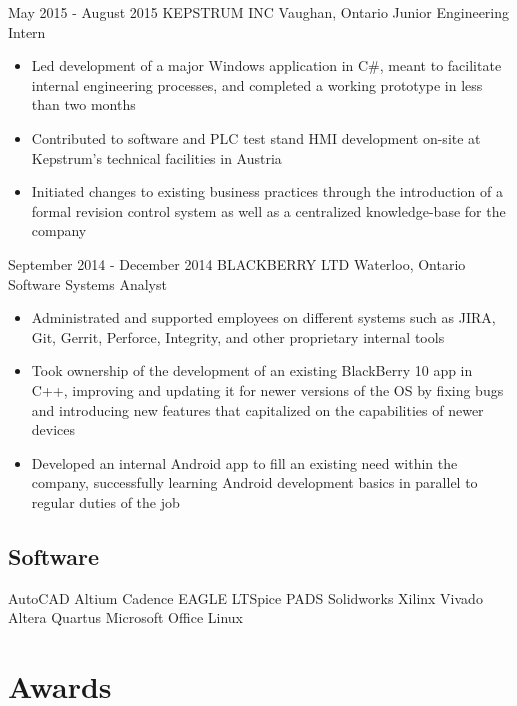 \documentclass[hidelinks]{kkurucz-cv}
\begin{document}
\begin{minipage}{\textwidth}
\begin{entrylist}
\entry
{May 2015 - August 2015}
{KEPSTRUM INC}
{Vaughan, Ontario}
{Junior Engineering Intern}
{
\begin{itemize}
	\item Led development of a major Windows application in C\#, meant to facilitate internal engineering processes, and completed a working prototype in less than two months
	\item Contributed to software and PLC test stand HMI development on-site at Kepstrum’s technical facilities in Austria
	\item Initiated changes to existing business practices through the introduction of a formal revision control system as well as a centralized knowledge-base for the company
\end{itemize}
}

\entry
{September 2014 - December 2014}
{BLACKBERRY LTD}
{Waterloo, Ontario}
{Software Systems Analyst}
{
\begin{itemize}
	\item Administrated and supported employees on different systems such as JIRA, Git, Gerrit, Perforce, Integrity, and other proprietary internal tools
	\item Took ownership of the development of an existing BlackBerry 10 app in C++, improving and updating it for newer versions of the OS by fixing bugs and introducing new features that capitalized on the capabilities of newer devices 
	\item Developed an internal Android app to fill an existing need within the company, successfully learning Android development basics in parallel to regular duties of the job
\end{itemize}
}
\end{entrylist}
\end{minipage}

\newpage

\begin{aside2}
\section{Software}
AutoCAD
Altium
Cadence
EAGLE
LTSpice
PADS
Solidworks
Xilinx Vivado
Altera Quartus
Microsoft Office
Linux
\end{aside2}

\section{Awards}
\end{document}
